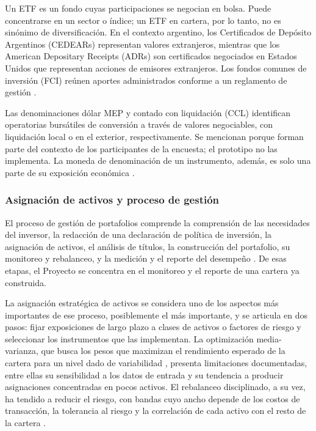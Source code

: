 Un ETF es un fondo cuyas participaciones se negocian en bolsa. Puede concentrarse en un sector o índice; un ETF en cartera, por lo tanto, no es sinónimo de diversificación. En el contexto argentino, los Certificados de Depósito Argentinos (CEDEARs) representan valores extranjeros, mientras que los American Depositary Receipts (ADRs) son certificados negociados en Estados Unidos que representan acciones de emisores extranjeros. Los fondos comunes de inversión (FCI) reúnen aportes administrados conforme a un reglamento de gestión \parencite{CNVCedears,SECADR,Ley24083}.

Las denominaciones dólar MEP y contado con liquidación (CCL) identifican operatorias bursátiles de conversión a través de valores negociables, con liquidación local o en el exterior, respectivamente. Se mencionan porque forman parte del contexto de los participantes de la encuesta; el prototipo no las implementa. La moneda de denominación de un instrumento, además, es solo una parte de su exposición económica \parencite{BYMAGlosario}.

\subsubsection{Asignación de activos y proceso de gestión}\label{subsec:asignacion-activos}

El proceso de gestión de portafolios comprende la comprensión de las necesidades del inversor, la redacción de una declaración de política de inversión, la asignación de activos, el análisis de títulos, la construcción del portafolio, su monitoreo y rebalanceo, y la medición y el reporte del desempeño \parencite{CFA2026portfolio}. De esas etapas, el Proyecto se concentra en el monitoreo y el reporte de una cartera ya construida.

La asignación estratégica de activos se considera uno de los aspectos más importantes de ese proceso, posiblemente el más importante, y se articula en dos pasos: fijar exposiciones de largo plazo a clases de activos o factores de riesgo y seleccionar los instrumentos que las implementan. La optimización media-varianza, que busca los pesos que maximizan el rendimiento esperado de la cartera para un nivel dado de variabilidad \parencite{Markowitz1952}, presenta limitaciones documentadas, entre ellas su sensibilidad a los datos de entrada y su tendencia a producir asignaciones concentradas en pocos activos. El rebalanceo disciplinado, a su vez, ha tendido a reducir el riesgo, con bandas cuyo ancho depende de los costos de transacción, la tolerancia al riesgo y la correlación de cada activo con el resto de la cartera \parencite{CFA2026allocation}.

